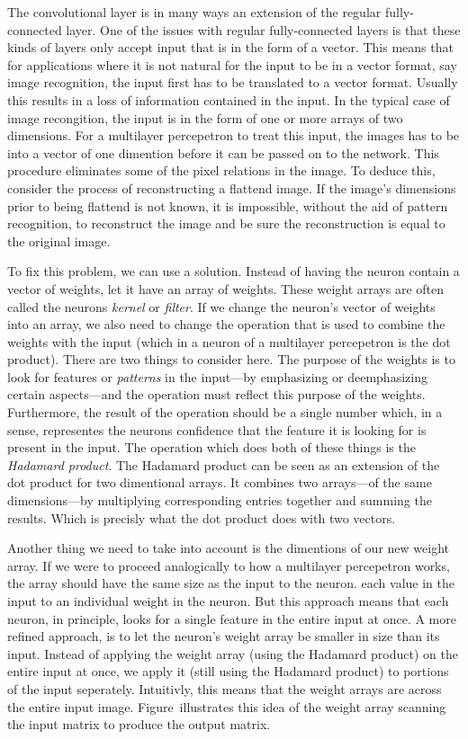 The convolutional layer is in many ways an extension of the regular fully-connected layer.
One of the issues with regular fully-connected layers is that these kinds of layers only accept input that is in the form of a vector.
This means that for applications where it is not natural for the input to be in a vector format, say image recognition, the input first has to be translated to a vector format.
Usually this results in a loss of information contained in the input.
In the typical case of image recongition, the input is in the form of one or more arrays of two dimensions.
For a multilayer percepetron to treat this input, the images has to be  into a vector of one dimention before it can be passed on to the network.
This procedure eliminates some of the pixel relations in the image.
To deduce this, consider the process of reconstructing a flattend image.
If the image's dimensions prior to being flattend is not known, it is impossible, without the aid of pattern recognition, to reconstruct the image and be sure the reconstruction is equal to the original image.

To fix this problem, we can use a  solution.
Instead of having the neuron contain a vector of weights, let it have an array of weights.
These weight arrays are often called the neurons {\em kernel} or {\em filter}.
If we change the neuron's vector of weights into an array, we also need to change the operation that is used to combine the weights with the input (which in a neuron of a multilayer percepetron is the dot product).
There are two things to consider here.
The purpose of the weights is to look for features or {\em patterns} in the input---by emphasizing or deemphasizing certain aspects---and the operation must reflect this purpose of the weights.
Furthermore, the result of the operation should be a single number which, in a sense, representes the neurons  confidence that the feature it is looking for is present in the input.
The operation which does both of these things is the {\em Hadamard product}.
The Hadamard product can be seen as an extension of the dot product for two dimentional arrays.
It combines two arrays---of the same dimensions---by multiplying corresponding entries together and summing the results.
Which is precisly what the dot product does with two vectors.

Another thing we need to take into account is the dimentions of our new weight array.
If we were to proceed analogically to how a multilayer percepetron works, the array should have the same size as the input to the neuron.
 each value in the input to an individual weight in the neuron.
But this approach means that each neuron, in principle, looks for a single feature in the entire input at once.
A more refined approach, is to let the neuron's weight array be smaller in size than its input.
Instead of applying the weight array (using the Hadamard product) on the entire input at once, we apply it (still using the Hadamard product) to portions of the input seperately.
Intuitivly, this means that the weight arrays are  across the entire input image.
Figure~ illustrates this idea of the weight array scanning the input matrix to produce the output matrix.

